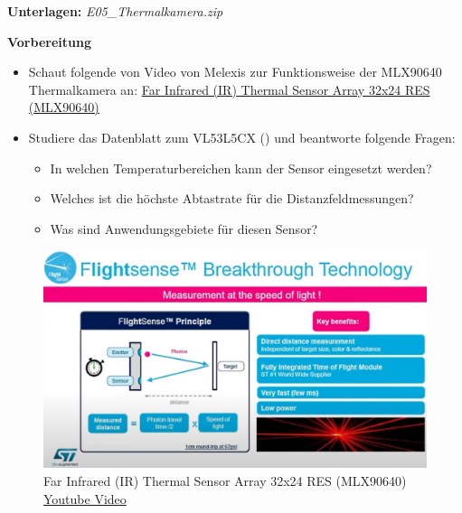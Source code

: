 \documentclass[
  11pt,
  a4paperpaper,
  oneside, openany  ,captions=tableheading
]{scrbook}
\providecommand{\tightlist}{%
  \setlength{\itemsep}{0pt}\setlength{\parskip}{0pt}}
\theoremstyle{definition}
\theoremstyle{remark}
\begin{document}
\textbf{Unterlagen:} \emph{ E05\_Thermalkamera.zip}

\textbf{Vorbereitung}

\begin{itemize}
\tightlist
\item
  Schaut folgende von Video von Melexis zur Funktionsweise der MLX90640
  Thermalkamera an:
  \href{https://www.youtube.com/embed/WSZ3GGDusTk?si=WTfxZ3m2axljCwDG}{Far
  Infrared (IR) Thermal Sensor Array 32x24 RES (MLX90640)}
\item
  Studiere das Datenblatt zum VL53L5CX
  () und beantworte folgende
  Fragen:

  \begin{itemize}
  \tightlist
  \item
    In welchen Temperaturbereichen kann der Sensor eingesetzt werden?
  \item
    Welches ist die höchste Abtastrate für die Distanzfeldmessungen?
  \item
    Was sind Anwendungsgebiete für diesen Sensor?
  \end{itemize}
\end{itemize}

\begin{figure}[H]

{\centering \includegraphics{images/youtube_adafruit_VL53L5CX.png}

}

\caption{Far Infrared (IR) Thermal Sensor Array 32x24 RES (MLX90640)
\href{https://www.youtube.com/embed/WSZ3GGDusTk?si=WTfxZ3m2axljCwDG}{Youtube
Video}}

\end{figure}%
\end{document}
